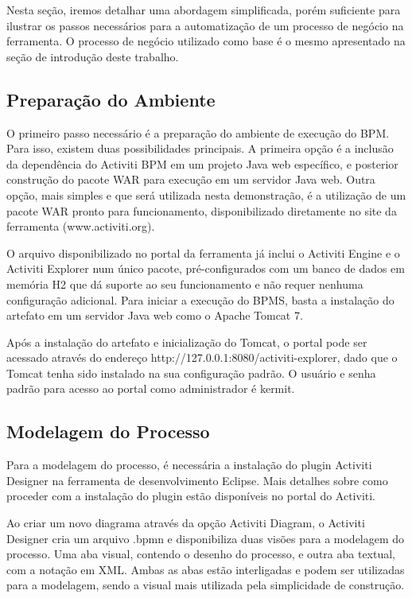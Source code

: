 Nesta seção, iremos detalhar uma abordagem simplificada, porém suficiente para ilustrar os passos necessários para a automatização de um processo de negócio na ferramenta.  O processo de negócio utilizado como base é o mesmo apresentado na seção de introdução deste trabalho.

\subsection{Preparação do Ambiente}\label{sec:activiti-automatizar_processo_preparacao_ambiente}

O primeiro passo necessário é a preparação do ambiente de execução do BPM. Para isso, existem duas possibilidades principais. A primeira opção é a inclusão da dependência do Activiti BPM em um projeto Java web específico, e posterior construção do pacote WAR para execução em um servidor Java web. Outra opção, mais simples e que será utilizada nesta demonstração, é a utilização de um pacote WAR pronto para funcionamento, disponibilizado diretamente no site da ferramenta (www.activiti.org).

O arquivo disponibilizado no portal da ferramenta já inclui o Activiti Engine e o Activiti Explorer num único pacote, pré-configurados com um banco de dados em memória H2 que dá suporte ao seu funcionamento e não requer nenhuma configuração adicional. Para iniciar a execução do BPMS, basta a instalação do artefato em um servidor Java web como o Apache Tomcat 7.

Após a instalação do artefato e inicialização do Tomcat, o portal pode ser acessado através do endereço http://127.0.0.1:8080/activiti-explorer, dado que o Tomcat tenha sido instalado na sua configuração padrão. O usuário e senha padrão para acesso ao portal como administrador é kermit.

\subsection{Modelagem do Processo}\label{sec:activiti-automatizar_processo_modelagem}

Para a modelagem do processo, é necessária a instalação do plugin Activiti Designer na ferramenta de desenvolvimento Eclipse. Mais detalhes sobre como proceder com a instalação do plugin estão disponíveis no portal do Activiti.

Ao criar um novo diagrama através da opção Activiti Diagram, o Activiti Designer cria um arquivo .bpmn e disponibiliza duas visões para a modelagem do processo. Uma aba visual, contendo o desenho do processo, e outra aba textual, com a notação em XML. Ambas as abas estão interligadas e podem ser utilizadas para a modelagem, sendo a visual mais utilizada pela simplicidade de construção.

